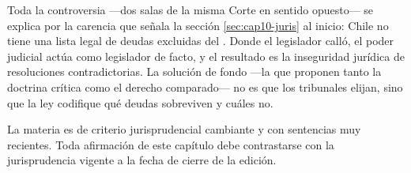 \begin{foco}
Toda la controversia ---dos salas de la misma Corte en sentido opuesto--- se explica por la
carencia que señala la sección \ref{sec:cap10-juris} al inicio: Chile no tiene una lista legal de
deudas excluidas del \discharge{}. Donde el legislador calló, el poder judicial actúa como
legislador de facto, y el resultado es la inseguridad jurídica de resoluciones contradictorias.
La solución de fondo ---la que proponen tanto la doctrina crítica como el derecho comparado--- no
es que los tribunales elijan, sino que la ley codifique qué deudas sobreviven y cuáles no.
\end{foco}

\begin{alerta}
La materia es de criterio jurisprudencial cambiante y con sentencias muy recientes. Toda
afirmación de este capítulo debe contrastarse con la jurisprudencia vigente a la fecha de
cierre de la edición.
\end{alerta}
